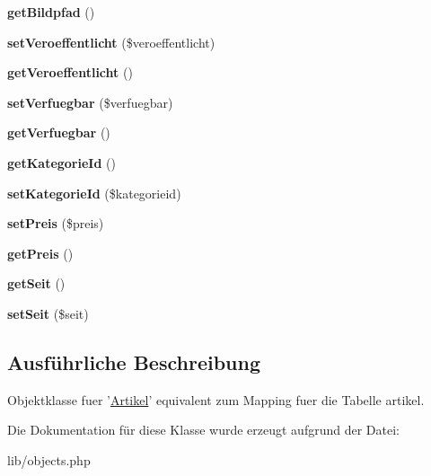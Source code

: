 \begin{DoxyCompactItemize}
\item 
\hypertarget{classArtikel_aad17675985534337a75b24f36fe7fb0b}{{\bfseries get\-Bildpfad} ()}\label{classArtikel_aad17675985534337a75b24f36fe7fb0b}

\item 
\hypertarget{classArtikel_abc4ddccc3c1597dd8367f733b4537999}{{\bfseries set\-Veroeffentlicht} (\$veroeffentlicht)}\label{classArtikel_abc4ddccc3c1597dd8367f733b4537999}

\item 
\hypertarget{classArtikel_a6e03b9f9bb79ad2b2471b96437c98a6f}{{\bfseries get\-Veroeffentlicht} ()}\label{classArtikel_a6e03b9f9bb79ad2b2471b96437c98a6f}

\item 
\hypertarget{classArtikel_abb6b0283547bb07656d5809ee577bdce}{{\bfseries set\-Verfuegbar} (\$verfuegbar)}\label{classArtikel_abb6b0283547bb07656d5809ee577bdce}

\item 
\hypertarget{classArtikel_a45b627212caa13e05484d74fe02479dc}{{\bfseries get\-Verfuegbar} ()}\label{classArtikel_a45b627212caa13e05484d74fe02479dc}

\item 
\hypertarget{classArtikel_aae722ab125e420f3852cdb77c6bb163c}{{\bfseries get\-Kategorie\-Id} ()}\label{classArtikel_aae722ab125e420f3852cdb77c6bb163c}

\item 
\hypertarget{classArtikel_af3132bd3d64fcb07756959f5a127d234}{{\bfseries set\-Kategorie\-Id} (\$kategorieid)}\label{classArtikel_af3132bd3d64fcb07756959f5a127d234}

\item 
\hypertarget{classArtikel_a2dcaa914ee5faa9d43c1ecd528cdfa6e}{{\bfseries set\-Preis} (\$preis)}\label{classArtikel_a2dcaa914ee5faa9d43c1ecd528cdfa6e}

\item 
\hypertarget{classArtikel_ae169c639a0a5be1ad87eb893949fea11}{{\bfseries get\-Preis} ()}\label{classArtikel_ae169c639a0a5be1ad87eb893949fea11}

\item 
\hypertarget{classArtikel_aa80094f9ad33453c4506eb6f71fa43f8}{{\bfseries get\-Seit} ()}\label{classArtikel_aa80094f9ad33453c4506eb6f71fa43f8}

\item 
\hypertarget{classArtikel_a6ff79c1ff7a9d5b33f292e302a9cac0b}{{\bfseries set\-Seit} (\$seit)}\label{classArtikel_a6ff79c1ff7a9d5b33f292e302a9cac0b}

\end{DoxyCompactItemize}


\subsection{\-Ausführliche \-Beschreibung}
\-Objektklasse fuer '\hyperlink{classArtikel}{\-Artikel}' equivalent zum \-Mapping fuer die \-Tabelle artikel. 

\-Die \-Dokumentation für diese \-Klasse wurde erzeugt aufgrund der \-Datei\-:\begin{DoxyCompactItemize}
\item 
lib/objects.\-php\end{DoxyCompactItemize}
